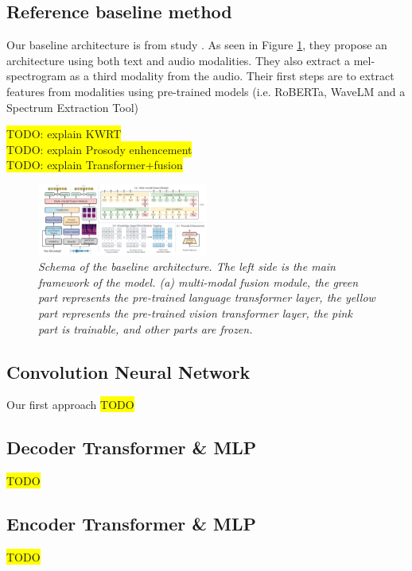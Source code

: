 \documentclass{article}
\begin{document}
\subsection{Reference baseline method}

Our baseline architecture is from study \cite{ERCFusionModel}.
As seen in Figure \ref{fig:BaselineArchitecture}, they propose an architecture using both text and audio modalities. They also extract a mel-spectrogram as a third modality from the audio. Their first steps are to extract features from modalities using pre-trained models (i.e. RoBERTa, WaveLM and a Spectrum Extraction Tool)

\colorbox{yellow}{TODO: explain KWRT}\\
\colorbox{yellow}{TODO: explain Prosody enhencement}\\
\colorbox{yellow}{TODO: explain Transformer+fusion}\\

\begin{figure}[htbp]
  \centering
  \includegraphics[width=0.5\textwidth]{Images/EPCFusion_BaselineArchitecture.png}
  \caption{\textit{Schema of the baseline architecture. The left side is the main framework of the model. (a) multi-modal fusion module, the green part represents the pre-trained
language transformer layer, the yellow part represents the pre-trained vision transformer layer, the pink part is trainable, and other
parts are frozen.}}
  \label{fig:BaselineArchitecture}
\end{figure}

\subsection{Convolution Neural Network}
Our first approach
\colorbox{yellow}{TODO}\\

\subsection{Decoder Transformer \& MLP}
\colorbox{yellow}{TODO}\\

\subsection{Encoder Transformer \& MLP}
\colorbox{yellow}{TODO}\\
\end{document}
